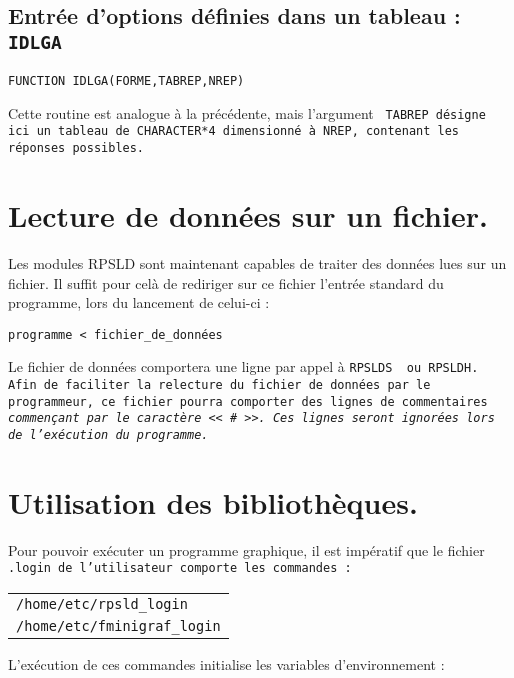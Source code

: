\documentclass[a4paper,12pt,titlepage]{article}
\newcommand{\ffun}[1]{\hbox {\tt FUNCTION   #1  } \medskip }
\begin{document}
\subsection{Entr\'ee d'options d\'efinies dans un tableau : \tt IDLGA}
\ffun{IDLGA(FORME,TABREP,NREP)} 

   Cette routine est analogue \`a la pr\'ec\'edente, mais l'argument \tt
TABREP\rm\ d\'esigne ici un tableau de \tt CHARACTER*4\rm\ dimensionn\'e \`a
\tt NREP\rm, contenant les r\'eponses possibles.

\section{Lecture de donn\'ees sur un fichier.}

   Les modules RPSLD sont maintenant capables de traiter des donn\'ees lues
sur un fichier. Il suffit pour cel\`a de rediriger sur ce fichier l'entr\'ee
standard du programme, lors du lancement de celui-ci : 

\begin{center}
     {\tt programme < fichier\_de\_donn\'ees}
\end{center}

   Le fichier de donn\'ees comportera une ligne par appel \`a \tt RPSLDS
\rm\ ou \tt RPSLDH\rm. Afin de faciliter la relecture du fichier de
donn\'ees par le programmeur, ce fichier pourra comporter des lignes de
commentaires \em commen\c{c}ant par le caract\`ere\em\ << \# >>. Ces lignes
seront ignor\'ees lors de l'ex\'ecution du programme.

\section{Utilisation des biblioth\`eques.}

    Pour pouvoir ex\'ecuter un programme graphique, il est imp\'eratif 
que le fichier \tt .login\rm\  de l'uti\-lisa\-teur comporte les commandes : 
  \begin{center}\begin{tabular}{l}
     \verb+/home/etc/rpsld_login+\\
     \verb+/home/etc/fminigraf_login+
  \end{tabular}\end{center}

    L'ex\'ecution de ces commandes initialise les variables
d'en\-viron\-ne\-ment : 
\end{document}
